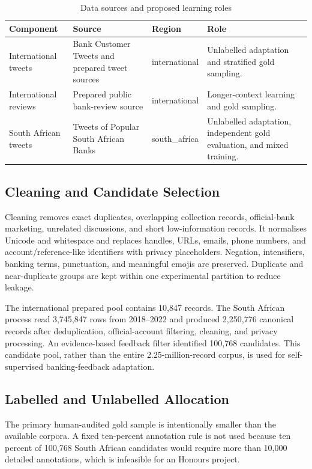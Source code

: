 \documentclass[11pt,a4paper]{article}
\begin{document}
\begin{table}[H]
\centering
\caption{Data sources and proposed learning roles}
\small
\begin{tabular}{p{3.4cm}p{3.8cm}p{2.4cm}p{4.2cm}}
\toprule
\textbf{Component} & \textbf{Source} & \textbf{Region} & \textbf{Role}\\
\midrule
International tweets & Bank Customer Tweets and prepared tweet sources & international & Unlabelled adaptation and stratified gold sampling.\\
International reviews & Prepared public bank-review source & international & Longer-context learning and gold sampling.\\
South African tweets & Tweets of Popular South African Banks & south\_africa & Unlabelled adaptation, independent gold evaluation, and mixed training.\\
\bottomrule
\end{tabular}
\end{table}

\subsection{Cleaning and Candidate Selection}
Cleaning removes exact duplicates, overlapping collection records, official-bank marketing, unrelated discussions, and short low-information records. It normalises Unicode and whitespace and replaces handles, URLs, emails, phone numbers, and account/reference-like identifiers with privacy placeholders. Negation, intensifiers, banking terms, punctuation, and meaningful emojis are preserved. Duplicate and near-duplicate groups are kept within one experimental partition to reduce leakage.

The international prepared pool contains 10,847 records. The South African process read 3,745,847 rows from 2018--2022 and produced 2,250,776 canonical records after deduplication, official-account filtering, cleaning, and privacy processing. An evidence-based feedback filter identified 100,768 candidates. This candidate pool, rather than the entire 2.25-million-record corpus, is used for self-supervised banking-feedback adaptation.

\subsection{Labelled and Unlabelled Allocation}
The primary human-audited gold sample is intentionally smaller than the available corpora. A fixed ten-percent annotation rule is not used because ten percent of 100,768 South African candidates would require more than 10,000 detailed annotations, which is infeasible for an Honours project.
\end{document}
